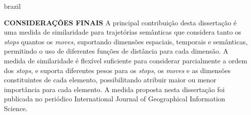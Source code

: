 {\begin{otherlanguage*}{brazil}
\begin{resumo}
        \newline
        \newline
        \textbf{CONSIDERAÇÕES FINAIS}
        \newline
        \newline
        A principal contribuição desta dissertação é uma medida de similaridade para trajetórias semânticas que considera tanto os \emph{stops} quantos os \emph{moves}, suportando dimensões espaciais, temporais e semânticas, permitindo o uso de diferentes funções de distância para cada dimensão. A medida de similaridade é flexível suficiente para considerar parcialmente a ordem dos \emph{stops}, e suporta diferentes pesos para os \emph{stops}, os \emph{moves} e as dimensões constituintes de cada elemento, possibilitando atribuir maior ou menor importância para cada elemento. A medida proposta nesta dissertação foi publicada no periódico International Journal of Geographical Information Science.

    \end{resumo}
    \end{otherlanguage*}
}
